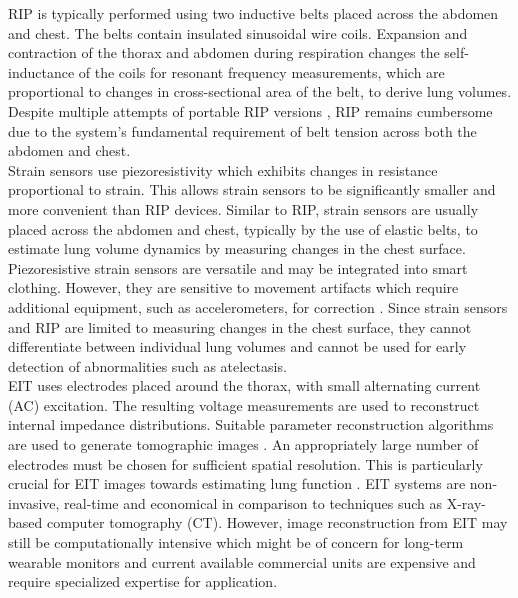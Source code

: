\documentclass[journal]{IEEEtran}
\begin{document}
\hspace{-0.5em}RIP is typically performed using two inductive belts placed across the abdomen and chest. The belts contain insulated sinusoidal wire coils. Expansion and contraction of the thorax and abdomen during respiration changes the self-inductance of the coils for resonant frequency measurements, which are proportional to changes in cross-sectional area of the belt, to derive lung volumes. Despite multiple attempts of portable RIP versions \cite{LifeShirtAdvancedSystem}, RIP remains cumbersome due to the system's fundamental requirement of belt tension across both the abdomen and chest. \\ 
Strain sensors use piezoresistivity which exhibits changes in resistance proportional to strain. This allows strain sensors to be significantly smaller and more convenient than RIP devices. Similar to RIP, strain sensors are usually placed across the abdomen and chest, typically by the use of elastic belts, to estimate lung volume dynamics by measuring changes in the chest surface. Piezoresistive strain sensors are versatile and may be integrated into smart clothing. However, they are sensitive to movement artifacts which require additional equipment, such as accelerometers, for correction \cite{defazioOverviewWearablePiezoresistive2021}. Since strain sensors and RIP are limited to measuring changes in the chest surface, they cannot differentiate between individual lung volumes and cannot be used for early detection of abnormalities such as atelectasis. \\
EIT uses electrodes placed around the thorax, with small alternating current (AC) excitation. The resulting voltage measurements are used to reconstruct internal impedance distributions. Suitable parameter reconstruction algorithms are used to generate tomographic images \cite{mansouriElectricalImpedanceTomography2021}. An appropriately large number of electrodes must be chosen for sufficient spatial resolution. This is particularly crucial for EIT images towards estimating lung function \cite{pennatiElectricalImpedanceTomography2023}. EIT systems are non-invasive, real-time and economical in comparison to techniques such as X-ray-based computer tomography (CT). However, image reconstruction from EIT may still be computationally intensive which might be of concern for long-term wearable monitors \cite{boyleAddressingComputationalCost2012} and current available commercial units are expensive and require specialized expertise for application. \\
\end{document}
